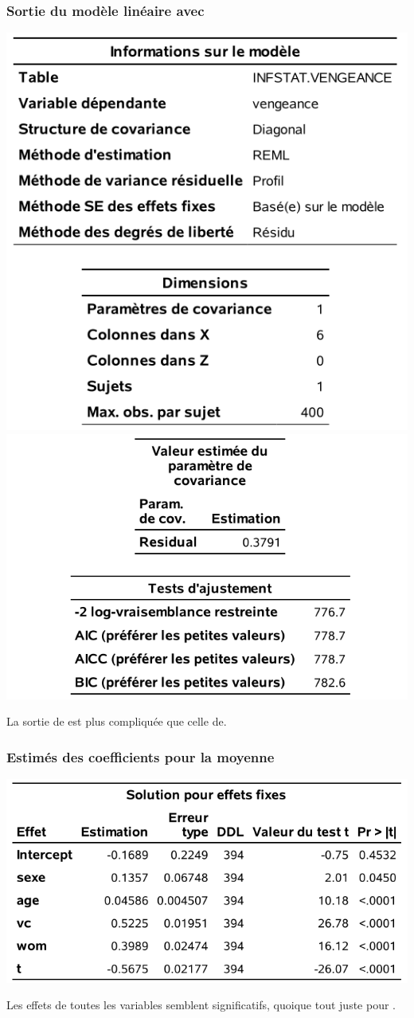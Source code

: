\documentclass{beamer}
\begin{document}
 \begin{frame}
\frametitle{Sortie du modèle linéaire avec }
\begin{center}
\includegraphics[width = 0.45\linewidth]{img/c5/diapos6-e03}
\includegraphics[width = 0.5\linewidth]{img/c5/diapos6-e04}
\end{center}
{\footnotesize La sortie de  est plus compliquée que celle de.


}

\end{frame}
\begin{frame}
\frametitle{Estimés des coefficients pour la moyenne}
\begin{center}
\includegraphics[width = 0.7\linewidth]{img/c5/diapos6-e05}
\end{center}
Les effets de toutes les variables semblent significatifs, quoique tout juste pour .
\end{frame}
\end{document}
